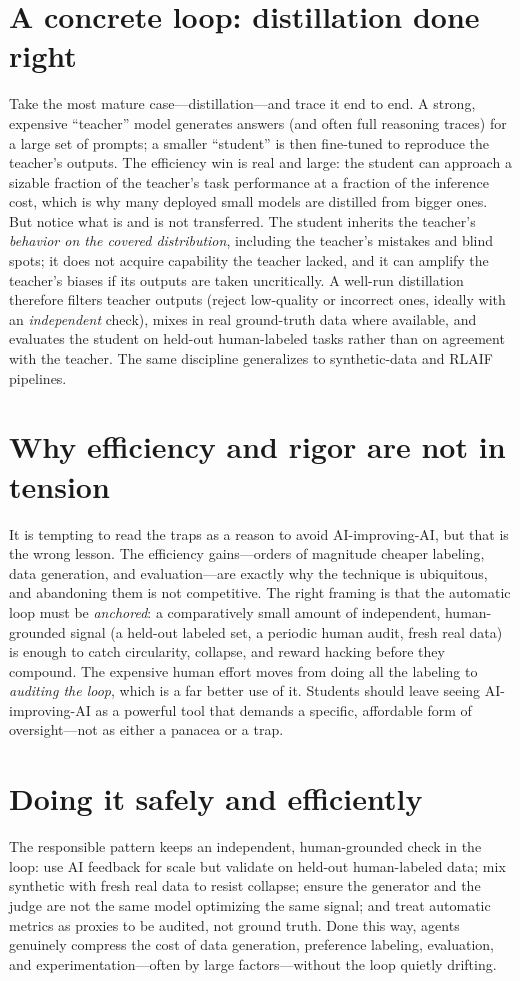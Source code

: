 \documentclass[11pt]{article}
\begin{document}
\section{A concrete loop: distillation done right}
Take the most mature case---distillation---and trace it end to end. A strong, expensive ``teacher'' model
generates answers (and often full reasoning traces) for a large set of prompts; a smaller ``student'' is
then fine-tuned to reproduce the teacher's outputs. The efficiency win is real and large: the student can
approach a sizable fraction of the teacher's task performance at a fraction of the inference cost, which is
why many deployed small models are distilled from bigger ones. But notice what is and is not transferred.
The student inherits the teacher's \emph{behavior on the covered distribution}, including the teacher's
mistakes and blind spots; it does not acquire capability the teacher lacked, and it can amplify the
teacher's biases if its outputs are taken uncritically. A well-run distillation therefore filters teacher
outputs (reject low-quality or incorrect ones, ideally with an \emph{independent} check), mixes in real
ground-truth data where available, and evaluates the student on held-out human-labeled tasks rather than on
agreement with the teacher. The same discipline generalizes to synthetic-data and RLAIF pipelines.

\section{Why efficiency and rigor are not in tension}
It is tempting to read the traps as a reason to avoid AI-improving-AI, but that is the wrong lesson. The
efficiency gains---orders of magnitude cheaper labeling, data generation, and evaluation---are exactly why
the technique is ubiquitous, and abandoning them is not competitive. The right framing is that the automatic
loop must be \emph{anchored}: a comparatively small amount of independent, human-grounded signal (a held-out
labeled set, a periodic human audit, fresh real data) is enough to catch circularity, collapse, and reward
hacking before they compound. The expensive human effort moves from doing all the labeling to \emph{auditing
the loop}, which is a far better use of it. Students should leave seeing AI-improving-AI as a powerful tool
that demands a specific, affordable form of oversight---not as either a panacea or a trap.

\section{Doing it safely and efficiently}
The responsible pattern keeps an independent, human-grounded check in the loop: use AI feedback for scale
but validate on held-out human-labeled data; mix synthetic with fresh real data to resist collapse;
ensure the generator and the judge are not the same model optimizing the same signal; and treat automatic
metrics as proxies to be audited, not ground truth. Done this way, agents genuinely compress the cost of
data generation, preference labeling, evaluation, and experimentation---often by large factors---without
the loop quietly drifting.
\end{document}
